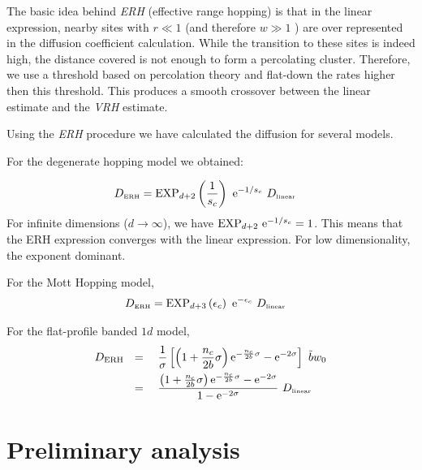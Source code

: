 The basic idea behind \emph{ERH} (effective range hopping) is that in the linear
expression, nearby sites 
with $r\ll 1$ (and therefore $w \gg 1$ ) are over represented in
the diffusion coefficient calculation. While the transition to
these sites is indeed high, the distance covered is not enough
to form a percolating cluster. Therefore, we use a threshold based
on percolation theory and flat-down the rates higher then this threshold.
This produces a smooth crossover between the linear
estimate and the \emph{VRH} estimate.


Using the \emph{ERH} procedure we have calculated the diffusion for several models.


For the degenerate hopping model we obtained:

\begin{align}
D_{\tbox{ERH}} &=  \mathrm{EXP}_{d{+}2}\left(\frac{1}{s_c}\right)  \  \eexp{-1/s_c}  \ D_{\tbox{linear}}
\end{align}
%
For infinite dimensions ($d\rightarrow\infty$),  we have $\mathrm{EXP}_{d{+}2}\  \mbox{e}^{-1/s_c} = 1$. 
This means that the ERH expression converges with the linear expression.
For low dimensionality, the exponent dominant.


For the Mott Hopping model,
%
\begin{align}
D_{\tbox{ERH}} &=\mathrm{EXP}_{d{+}3}\left(\epsilon_c\right)  \  \eexp{-\epsilon_c}  \ D_{\tbox{linear}}
\end{align}
%


For the flat-profile banded $1d$ model,
\begin{align}
D_{\text{ERH}} \ \ &= \ \ 
\ \frac{1}{\sigma}\left[ 
\left(1+\frac{n_c}{2b}\sigma\right)\eexp{-\frac{n_c}{2b}\sigma} - \eexp{-2\sigma}
\right] \ \tilde{b} w_0 \\ &=\ \ 
\ \frac{\left(1+\frac{n_c}{2b}\sigma\right)\eexp{-\frac{n_c}{2b}\sigma} - \eexp{-2\sigma}}
       {1 - \eexp{-2\sigma}}
   \ D_{\tbox{linear}}
\end{align}



\chapter{Preliminary analysis}





